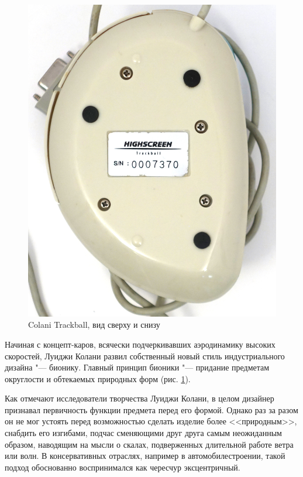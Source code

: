 \documentclass[11pt, a4paper]{article}
\begin{document}
\begin{figure}[h]
    \includegraphics[scale=0.39]{1993_colani_trackball/bottom_w_30.jpg}

    \caption{Colani Trackball, вид сверху и снизу}
    \label{fig:ColaniTopBottom}
\end{figure}

Начиная с концепт-каров, всячески подчеркивавших аэродинамику высоких скоростей, Луиджи Колани развил собственный новый стиль индустриального дизайна "--- бионику. Главный принцип бионики "--- придание предметам округлости и обтекаемых природных форм (рис. \ref{fig:ColaniTopBottom}).

{Как отмечают исследователи творчества Луиджи Колани, в целом дизайнер признавал первичность функции предмета перед его формой. Однако раз за разом он не мог устоять перед возможностью сделать изделие более <<природным>>, снабдить его изгибами, подчас сменяющими друг друга самым неожиданным образом, наводящим на мысли о скалах, подверженных длительной работе ветра или волн. В консервативных отраслях, например в автомобилестроении, такой подход обоснованно воспринимался как чересчур эксцентричный.}
\end{document}
